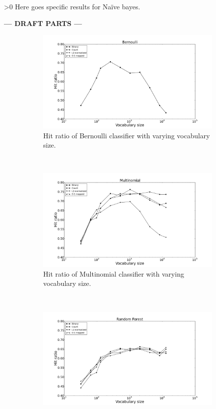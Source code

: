 \ifnum\printdraft>0
	Here goes specific results for Naïve bayes.
\else
\begin{center}
  	\textbf{--- DRAFT PARTS ---}
\end{center}
\fi
\newcommand{\figwidth}{0.49\textwidth}
\begin{figure}[H]
	\centering
	\begin{subfigure}[b]{\figwidth}
		\includegraphics[width=\textwidth]{img/Bernoulli-hitrate-eps-converted-to.pdf}
		\caption{Hit ratio of Bernoulli classifier with varying vocabulary size.}
		\label{fig:hitrate-nb}
	\end{subfigure}
	~
	\begin{subfigure}[b]{\figwidth}
		\includegraphics[width=\textwidth]{img/Multinomial-hitrate-eps-converted-to.pdf}
		\caption{Hit ratio of Multinomial classifier with varying vocabulary size.}
		\label{fig:hitrate-mn}
	\end{subfigure}
	\\
	\begin{subfigure}[b]{\figwidth}
		\includegraphics[width=\textwidth]{img/Random-Forest-hitrate-eps-converted-to.pdf}

\end{subfigure}
\end{figure}
